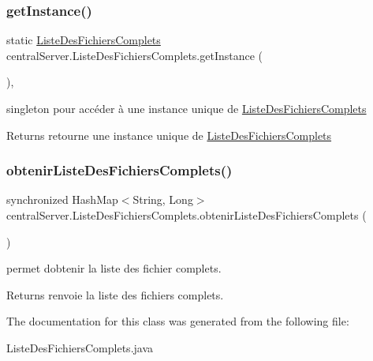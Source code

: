\subsubsection{\texorpdfstring{get\+Instance()}{getInstance()}}
{\footnotesize\ttfamily static \hyperlink{classcentralServer_1_1ListeDesFichiersComplets}{Liste\+Des\+Fichiers\+Complets} central\+Server.\+Liste\+Des\+Fichiers\+Complets.\+get\+Instance (\begin{DoxyParamCaption}{ }\end{DoxyParamCaption})\hspace{0.3cm}{\ttfamily [inline]}, {\ttfamily [static]}}



singleton pour accéder à une instance unique de \hyperlink{classcentralServer_1_1ListeDesFichiersComplets}{Liste\+Des\+Fichiers\+Complets} 

\begin{DoxyReturn}{Returns}
retourne une instance unique de \hyperlink{classcentralServer_1_1ListeDesFichiersComplets}{Liste\+Des\+Fichiers\+Complets} 
\end{DoxyReturn}
\mbox{\label{classcentralServer_1_1ListeDesFichiersComplets_a333cc85a4c4d342123ee286b30e7a14e}} 
\subsubsection{\texorpdfstring{obtenir\+Liste\+Des\+Fichiers\+Complets()}{obtenirListeDesFichiersComplets()}}
{\footnotesize\ttfamily synchronized Hash\+Map$<$String, Long$>$ central\+Server.\+Liste\+Des\+Fichiers\+Complets.\+obtenir\+Liste\+Des\+Fichiers\+Complets (\begin{DoxyParamCaption}{ }\end{DoxyParamCaption})\hspace{0.3cm}{\ttfamily [inline]}}



permet d\textquotesingle{}obtenir la liste des fichier complets. 

\begin{DoxyReturn}{Returns}
renvoie la liste des fichiers complets. 
\end{DoxyReturn}


The documentation for this class was generated from the following file\+:\begin{DoxyCompactItemize}
\item 
Liste\+Des\+Fichiers\+Complets.\+java\end{DoxyCompactItemize}
